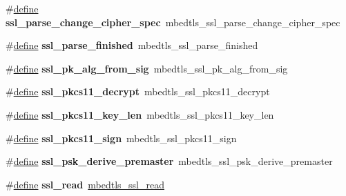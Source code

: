 \begin{DoxyCompactItemize}
\item 
\mbox{\label{compat-1_83_8h_a6b2ce4ffcac487d16b83146a1d133762}} 
\#\hyperlink{structdefine}{define} {\bfseries ssl\+\_\+parse\+\_\+change\+\_\+cipher\+\_\+spec}~mbedtls\+\_\+ssl\+\_\+parse\+\_\+change\+\_\+cipher\+\_\+spec
\item 
\mbox{\label{compat-1_83_8h_a5eb43e8dcccd8004696ad83ecf61193e}} 
\#\hyperlink{structdefine}{define} {\bfseries ssl\+\_\+parse\+\_\+finished}~mbedtls\+\_\+ssl\+\_\+parse\+\_\+finished
\item 
\mbox{\label{compat-1_83_8h_a1e36b011310fa9b2e8752ca8c2dd953a}} 
\#\hyperlink{structdefine}{define} {\bfseries ssl\+\_\+pk\+\_\+alg\+\_\+from\+\_\+sig}~mbedtls\+\_\+ssl\+\_\+pk\+\_\+alg\+\_\+from\+\_\+sig
\item 
\mbox{\label{compat-1_83_8h_ac2e92daa9fe5ae832390236be3aaef2e}} 
\#\hyperlink{structdefine}{define} {\bfseries ssl\+\_\+pkcs11\+\_\+decrypt}~mbedtls\+\_\+ssl\+\_\+pkcs11\+\_\+decrypt
\item 
\mbox{\label{compat-1_83_8h_a48b04f4ea6bfa4121425f0bbf1ea2fd6}} 
\#\hyperlink{structdefine}{define} {\bfseries ssl\+\_\+pkcs11\+\_\+key\+\_\+len}~mbedtls\+\_\+ssl\+\_\+pkcs11\+\_\+key\+\_\+len
\item 
\mbox{\label{compat-1_83_8h_a1c6c845a38794a0e5331a84e033d32ef}} 
\#\hyperlink{structdefine}{define} {\bfseries ssl\+\_\+pkcs11\+\_\+sign}~mbedtls\+\_\+ssl\+\_\+pkcs11\+\_\+sign
\item 
\mbox{\label{compat-1_83_8h_a06e770536d6ef102492470f049f34ed5}} 
\#\hyperlink{structdefine}{define} {\bfseries ssl\+\_\+psk\+\_\+derive\+\_\+premaster}~mbedtls\+\_\+ssl\+\_\+psk\+\_\+derive\+\_\+premaster
\item 
\mbox{\label{compat-1_83_8h_a89c2cc5d78bdf46b8fbb5bde6d534240}} 
\#\hyperlink{structdefine}{define} {\bfseries ssl\+\_\+read}~\hyperlink{ssl_8h_aa2c29eeb1deaf5ad9f01a7515006ede5}{mbedtls\+\_\+ssl\+\_\+read}
\item 
\mbox{\label{compat-1_83_8h_af81f465b129db3947d2ebfca931dd1f4}} 

\end{DoxyCompactItemize}

